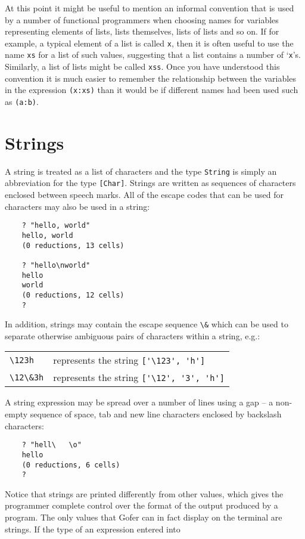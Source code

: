At this point  it  might  be  useful  to  mention  an  informal
convention that is used by a  number  of  functional  programmers  when
choosing names for variables  representing  elements  of  lists,  lists
themselves, lists of lists and  so  on.   If  for  example,  a  typical
element of a list is called \verb"x", then it is often useful to use the  name
\verb"xs" for a list of such values, suggesting that a list contains a  number
of `\verb"x"'s.  Similarly, a list of lists might be  called  
\verb"xss".   Once  you
have understood this convention it  is  much  easier  to  remember  the
relationship between the variables in the  expression  \verb"(x:xs)"  than  it
would be if different names had been used such as \verb"(a:b)".

\section{Strings}
A string is treated as a list of characters  and  the  type  \verb"String"  is
simply an abbreviation for the type \verb"[Char]".   Strings  are  written  as
sequences of characters enclosed between  speech  marks.   All  of  the
escape codes that can be used for characters may  also  be  used  in  a
string:
\begin{verbatim}
    ? "hello, world"
    hello, world
    (0 reductions, 13 cells)

    ? "hello\nworld"
    hello
    world
    (0 reductions, 12 cells)
    ?
\end{verbatim}
In addition, strings may contain the escape sequence \verb"\&" which can  be
used to separate otherwise  ambiguous  pairs  of  characters  within  a
string, e.g.:
\BQ
\begin{tabular}{ll}
    \verb"\123h"   &represents the string \verb"['\123', 'h']"\\
    \verb"\12\&3h" &represents the string \verb"['\12', '3', 'h']"
\end{tabular}
\EQ
A string expression may be spread over a number of lines using a gap --
a non-empty sequence of space, tab and new line characters enclosed  by
backslash characters:
\begin{verbatim}
    ? "hell\   \o"
    hello
    (0 reductions, 6 cells)
    ? 
\end{verbatim}
Notice that strings are printed  differently from other  values,  which
gives the programmer complete control over the  format  of  the  output
produced by a program.  The only values that Gofer can in fact  display
on the terminal are strings.  If the type of an expression entered into
